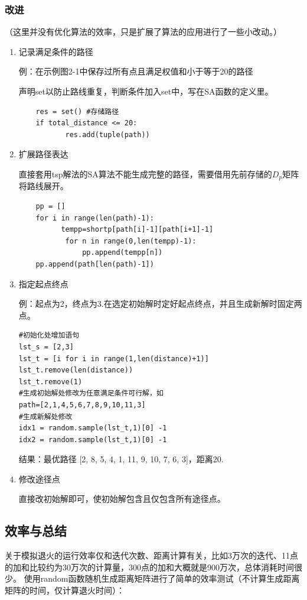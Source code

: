 \documentclass[12pt]{article}
\begin{document}
\subsubsection{改进}
（这里并没有优化算法的效率，只是扩展了算法的应用进行了一些小改动。）
\begin{enumerate}
\item 记录满足条件的路径

例：在示例图2-1中保存过所有点且满足权值和小于等于20的路径

声明set以防止路线重复，判断条件加入set中，写在SA函数的定义里。
\begin{lstlisting}
	res = set() #存储路径
	if total_distance <= 20:
           res.add(tuple(path))
\end{lstlisting}
\item 扩展路径表达

直接套用tsp解法的SA算法不能生成完整的路径，需要借用先前存储的$D_{p}$矩阵将路线展开。
\begin{lstlisting}
	pp = []
    for i in range(len(path)-1):
          tempp=shortp[path[i]-1][path[i+1]-1]
           for n in range(0,len(tempp)-1):
               pp.append(tempp[n])
    pp.append(path[len(path)-1])
\end{lstlisting}
\item 指定起点终点

例：起点为2，终点为3.在选定初始解时定好起点终点，并且生成新解时固定两点。
\begin{lstlisting}
#初始化处增加语句
lst_s = [2,3]
lst_t = [i for i in range(1,len(distance)+1)]
lst_t.remove(len(distance))
lst_t.remove(1)
#生成初始解处修改为任意满足条件可行解，如
path=[2,1,4,5,6,7,8,9,10,11,3]
#生成新解处修改
idx1 = random.sample(lst_t,1)[0] -1
idx2 = random.sample(lst_t,1)[0] -1
\end{lstlisting}
结果：最优路径 [2, 8, 5, 4, 1, 11, 9, 10, 7, 6, 3]，距离20.
\item 修改途径点

直接改初始解即可，使初始解包含且仅包含所有途径点。
\end{enumerate}
\subsection{效率与总结}
关于模拟退火的运行效率仅和迭代次数、距离计算有关，比如3万次的迭代、11点的加和比较约为30万次的计算量，300点的加和大概就是900万次，总体消耗时间很少。
使用random函数随机生成距离矩阵进行了简单的效率测试（不计算生成距离矩阵的时间，仅计算退火时间）：
\end{document}
